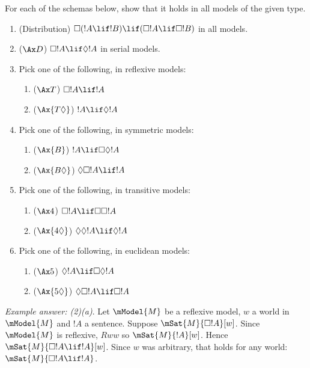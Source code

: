 \documentclass[../../../../include/open-logic-section]{subfiles}
\begin{document}


\begin{prob}

For each of the schemas below, show that it holds in all models of the given type.

\begin{enumerate}
	\item (Distribution) $\Box(!A \lif !B)\lif(\Box !A \lif \Box !B)$ in all models.
	\item ($\Ax D$) $\Box !A \lif \Diamond !A$ in serial models.
	\item Pick one of the following, in reflexive models:
	\begin{enumerate}
		\item ($\Ax T$) $\Box !A \lif !A$
		\item ($\Ax{T\Diamond}$) $!A \lif \Diamond !A$
	\end{enumerate}
	\item Pick one of the following, in symmetric models:
	\begin{enumerate}
		\item ($\Ax{B}$)  $!A \lif \Box \Diamond !A$
		\item ($\Ax{B\Diamond}$) $\Diamond \Box !A \lif !A$
	\end{enumerate}
	\item Pick one of the following, in transitive models:
	\begin{enumerate}
		\item ($\Ax 4$)  $\Box !A \lif \Box \Box !A$
		\item ($\Ax{4\Diamond}$) $\Diamond\Diamond !A \lif \Diamond !A$
	\end{enumerate}
	\item Pick one of the following, in euclidean models:
	\begin{enumerate}
		\item ($\Ax 5$) $\Diamond !A \lif \Box \Diamond !A$
		\item ($\Ax{5\Diamond}$) $\Diamond\Box !A \lif \Box !A$
	\end{enumerate}
\end{enumerate}

\emph{Example answer: (2)(a)}. Let $\mModel{M}$ be a reflexive 
model, $w$ a world in $\mModel{M}$ and $!A$ a sentence. Suppose 
$\mSat{M}{\Box !A}[w]$. Since $\mModel{M}$ is reflexive, $Rww$ so
$\mSat{M}{!A}[w]$. Hence $\mSat{M}{\Box !A \lif !A}[w]$. Since $w$
was arbitrary, that holds for any world: $\mSat{M}{\Box !A \lif !A}$. 


\end{prob}
\end{document}
